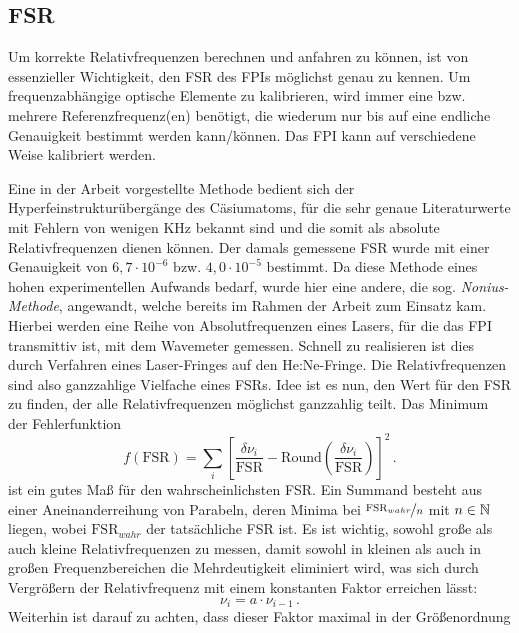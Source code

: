 \subsection{FSR}\label{subsec:FSR-messung}
Um korrekte Relativfrequenzen berechnen und anfahren zu
können, ist von essenzieller Wichtigkeit, den FSR des FPIs möglichst genau zu kennen. Um
frequenzabhängige optische Elemente zu kalibrieren, wird immer eine bzw. mehrere
Referenzfrequenz(en) benötigt, die wiederum nur bis auf eine endliche
Genauigkeit bestimmt werden kann/können. Das FPI kann auf verschiedene
Weise kalibriert werden.\par
Eine in der Arbeit \cite{kuschnick:2000:diplomarbeit}
vorgestellte Methode bedient sich der Hyperfeinstrukturübergänge des
Cäsiumatoms, für die sehr genaue Literaturwerte mit Fehlern von wenigen KHz \cite{PhysRevA.38.1616} bekannt sind
und die somit als absolute Relativfrequenzen dienen können. Der damals gemessene
FSR wurde mit einer Genauigkeit von $6,7\cdot10^{-6}$ bzw. $4,0\cdot10^{-5}$ bestimmt. Da
diese Methode eines hohen experimentellen Aufwands bedarf, wurde hier
eine andere, die sog. \textit{Nonius-Methode}, angewandt, welche bereits im
Rahmen der Arbeit \cite{schumann:2005:dissertation} zum Einsatz kam. Hierbei werden eine
Reihe von Absolutfrequenzen eines Lasers, für die das
FPI transmittiv ist, mit dem Wavemeter gemessen. Schnell
zu realisieren ist dies durch Verfahren eines Laser-Fringes auf den He:Ne-Fringe. Die Relativfrequenzen sind also ganzzahlige
Vielfache eines FSRs. Idee ist es nun, den Wert für den FSR zu finden, der alle
Relativfrequenzen möglichst ganzzahlig teilt. Das Minimum der Fehlerfunktion
\begin{equation}\label{eq:nonius}
	f(\text{FSR})=\sum\limits_i\left[\frac{\delta\nu_i}{\text{FSR}}-\text{Round}\left(\frac{\delta\nu_i}{\text{FSR}}\right)\right]^2\,.
\end{equation}
ist ein gutes Maß für den wahrscheinlichsten FSR.
Ein Summand besteht aus einer Aneinanderreihung von Parabeln, deren Minima bei
$\nicefrac{\text{FSR}_{wahr}}{n}$ mit $n\in\mathbb{N}$ liegen, wobei $\text{FSR}_{wahr}$
der tatsächliche FSR ist. Es ist wichtig, sowohl große als auch kleine
Relativfrequenzen zu messen, damit sowohl in kleinen als auch in großen
Frequenzbereichen die Mehrdeutigkeit eliminiert wird, was sich durch Vergrößern
der Relativfrequenz mit einem konstanten Faktor erreichen lässt:
\begin{equation}\label{eq:nonius_faktor}
	\nu_i=a\cdot\nu_{i-1}\,.
\end{equation}
Weiterhin ist darauf zu achten, dass dieser Faktor maximal in der Größenordnung
